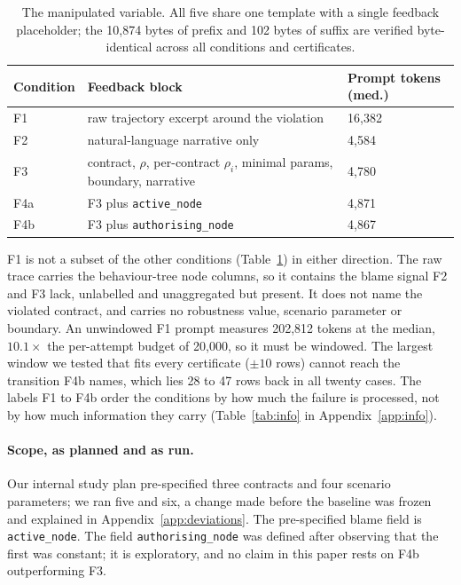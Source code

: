 \documentclass{article}
\newcommand{\rhoc}[1]{\rho_{#1}}
\begin{document}
\begin{table}[t]
\centering
\small
\caption{The manipulated variable. All five share one template with a single
feedback placeholder; the 10{,}874 bytes of prefix and 102 bytes of suffix are
verified byte-identical across all conditions and certificates.}
\label{tab:conditions}
\begin{tabular}{@{}lll@{}}
\toprule
\textbf{Condition} & \textbf{Feedback block} & \textbf{Prompt tokens (med.)} \\
\midrule
F1 & raw trajectory excerpt around the violation & 16{,}382 \\
F2 & natural-language narrative only & 4{,}584 \\
F3 & contract, $\rho$, per-contract $\rhoc{i}$, minimal params, boundary, narrative & 4{,}780 \\
F4a & F3 plus \texttt{active\_node} & 4{,}871 \\
F4b & F3 plus \texttt{authorising\_node} & 4{,}867 \\
\bottomrule
\end{tabular}
\end{table}

F1 is not a subset of the other conditions (Table~\ref{tab:conditions}) in
either direction. The raw trace
carries the behaviour-tree node columns, so it contains the blame signal F2 and
F3 lack, unlabelled and unaggregated but present. It does not name the violated
contract, and carries no robustness value, scenario parameter or boundary. An
unwindowed F1 prompt measures 202{,}812 tokens at the median, $10.1\times$ the
per-attempt budget of 20{,}000, so it must be windowed. The largest window we
tested that fits every certificate ($\pm 10$ rows) cannot reach the transition
F4b names, which lies 28 to 47 rows back in all twenty cases. The labels F1 to
F4b order the conditions by how much the failure is processed, not by how much
information they carry (Table~\ref{tab:info} in Appendix~\ref{app:info}).

\paragraph{Scope, as planned and as run.}
Our internal study plan pre-specified three contracts and four scenario parameters;
we ran five and six, a change made before the baseline was frozen and explained
in Appendix~\ref{app:deviations}. The pre-specified blame field is
\texttt{active\_node}. The field \texttt{authorising\_node} was defined after
observing that the first was constant; it is exploratory, and no claim in this paper rests on
F4b outperforming F3.
\end{document}
